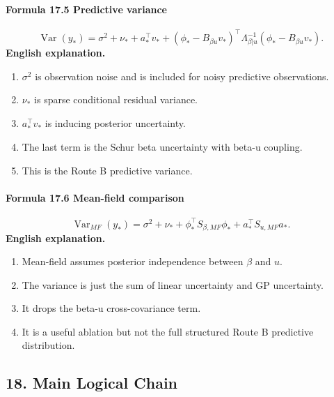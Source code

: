 \documentclass[12pt]{article}
\begin{document}
\paragraph{Formula 17.5 Predictive variance}
\[
\operatorname{Var}(y_*)
=
\sigma^2+\nu_*+a_*^\top v_*
+
\left(\phi_*-B_{\beta u}v_*\right)^\top
\Lambda_{\beta|u}^{-1}
\left(\phi_*-B_{\beta u}v_*\right).
\]
\textbf{English explanation.}
\begin{enumerate}[leftmargin=2em]
\item \(\sigma^2\) is observation noise and is included for noisy predictive observations.
\item \(\nu_*\) is sparse conditional residual variance.
\item \(a_*^\top v_*\) is inducing posterior uncertainty.
\item The last term is the Schur beta uncertainty with beta-u coupling.
\item This is the Route B predictive variance.
\end{enumerate}

\paragraph{Formula 17.6 Mean-field comparison}
\[
\operatorname{Var}_{MF}(y_*)
=
\sigma^2+\nu_*+
\phi_*^\top S_{\beta,MF}\phi_*
+
a_*^\top S_{u,MF}a_*.
\]
\textbf{English explanation.}
\begin{enumerate}[leftmargin=2em]
\item Mean-field assumes posterior independence between \(\beta\) and \(u\).
\item The variance is just the sum of linear uncertainty and GP uncertainty.
\item It drops the beta-u cross-covariance term.
\item It is a useful ablation but not the full structured Route B predictive distribution.
\end{enumerate}

\subsection{18. Main Logical Chain}
\end{document}
